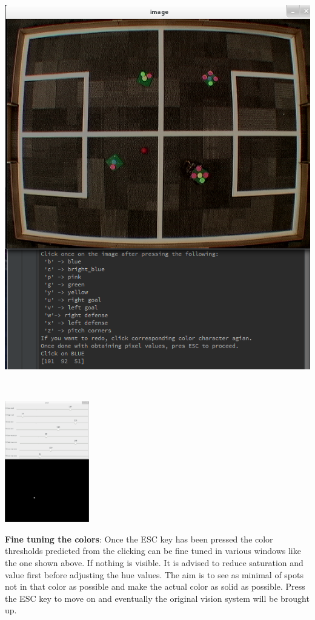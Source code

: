 \documentclass[a4paper,12pt]{article}
\begin{document}
\begin{minipage}{0.5\textwidth}
\centering
\includegraphics[scale=0.25]{images/calibration2.png}
\end{minipage}
~
\begin{minipage}{0.5\textwidth}
\centering
\includegraphics[height=200px]{images/calibration3.png}
\end{minipage}

\textbf{Fine tuning the colors}: Once the ESC key has been pressed the color thresholds predicted from the clicking can be fine tuned in various windows like the one shown above. If nothing is visible. It is advised to reduce saturation and value first before adjusting the hue values. The aim is to see as minimal of spots not in that color as possible and make the actual color as solid as possible. Press the ESC key to move on and eventually the original vision system will be brought up.
\end{document}
